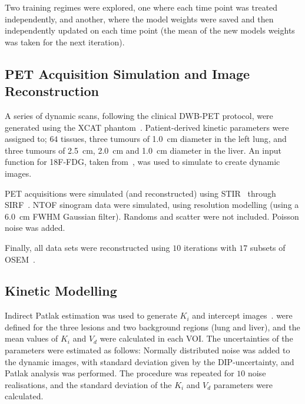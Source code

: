         Two training regimes were explored, one where each time point was treated independently, and another, where the model weights were saved and then independently updated on each time point (the mean of the new models weights was taken for the next iteration).
        
    \vspace{-0.4cm}
    
    \subsection{\acrshort{PET} Acquisition Simulation and Image Reconstruction} \label{sec:pet_acquisition_simulation_and_image_reconstruction}
        A series of dynamic scans, following the clinical \acrlong{DWB}-\acrshort{PET} protocol, were generated using the \acrshort{XCAT} phantom~\cite{segars4DXCATPhantom2010}. Patient-derived kinetic parameters were assigned to; $64$ tissues, three tumours of \SI{1.0}{\centi\meter} diameter in the left lung, and three tumours of \SI{2.5}{\centi\meter}, \SI{2.0}{\centi\meter} and \SI{1.0}{\centi\meter} diameter in the liver. An input function for \acrshort{18F-FDG}, taken from~\cite{langsjoEffectsSubanestheticKetamine2004}, was used to simulate  to create dynamic images.

        \acrshort{PET} acquisitions were simulated (and reconstructed) using \acrshort{STIR}~\cite{Thielemans2012} through \acrshort{SIRF}~\cite{Ovtchinnikov2017}. \acrlong{NTOF} sinogram data were simulated, using resolution modelling (using a \SI{6.0}{\centi\meter} \acrshort{FWHM} Gaussian filter). Randoms and scatter were not included. Poisson noise was added.%

        Finally, all data sets were reconstructed using $10$ iterations with $17$ subsets of \acrshort{OSEM}~\cite{Hudson1994}.

    \vspace{-0.4cm}
    
    \subsection{Kinetic Modelling} \label{sec:kinetic_modelling}
        Indirect Patlak estimation was used to generate $K_i$ and intercept images~\cite{patlak1983GraphicalEvaluationBloodtoBrain}.  were defined for the three lesions and two background regions (lung and liver), and the mean values of $K_i$ and $V_d$ were calculated in each \gls{VOI}. The uncertainties of the parameters were estimated as follows: Normally distributed noise was added to the dynamic images, with standard deviation given by the \gls{DIP}-uncertainty, and Patlak analysis was performed. The procedure was repeated for $10$ noise realisations, and the standard deviation of the $K_i$ and $V_d$ parameters were calculated.
        
